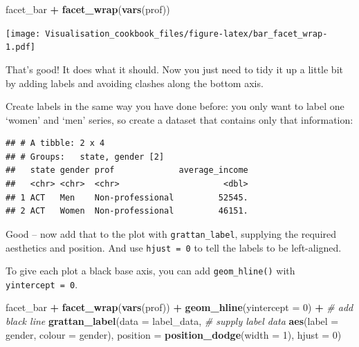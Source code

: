 \documentclass[]{book}
\newenvironment{Shaded}{\begin{snugshade}}{\end{snugshade}}
\newcommand{\CommentTok}[1]{\textcolor[rgb]{0.56,0.35,0.01}{\textit{#1}}}
\newcommand{\DataTypeTok}[1]{\textcolor[rgb]{0.13,0.29,0.53}{#1}}
\newcommand{\DecValTok}[1]{\textcolor[rgb]{0.00,0.00,0.81}{#1}}
\newcommand{\KeywordTok}[1]{\textcolor[rgb]{0.13,0.29,0.53}{\textbf{#1}}}
\newcommand{\NormalTok}[1]{#1}
\newcommand{\OperatorTok}[1]{\textcolor[rgb]{0.81,0.36,0.00}{\textbf{#1}}}
\newcommand{\StringTok}[1]{\textcolor[rgb]{0.31,0.60,0.02}{#1}}
\begin{document}
\begin{Shaded}
\begin{Highlighting}[]
\NormalTok{facet_bar }\OperatorTok{+}
\StringTok{  }\KeywordTok{facet_wrap}\NormalTok{(}\KeywordTok{vars}\NormalTok{(prof))}
\end{Highlighting}
\end{Shaded}

\texttt{[image: Visualisation\_cookbook\_files/figure-latex/bar\_facet\_wrap-1.pdf]}

That's good! It does what it should. Now you just need to tidy it up a little bit by adding labels and avoiding clashes along the bottom axis.

Create labels in the same way you have done before: you only want to label one `women' and `men' series, so create a dataset that contains only that information:

\begin{Shaded}
\end{Shaded}

\begin{verbatim}
## # A tibble: 2 x 4
## # Groups:   state, gender [2]
##   state gender prof             average_income
##   <chr> <chr>  <chr>                     <dbl>
## 1 ACT   Men    Non-professional         52545.
## 2 ACT   Women  Non-professional         46151.
\end{verbatim}

Good -- now add that to the plot with \texttt{grattan\_label}, supplying the required aesthetics and position. And use \texttt{hjust\ =\ 0} to tell the labels to be left-aligned.

To give each plot a black base axis, you can add \texttt{geom\_hline()} with \texttt{yintercept\ =\ 0}.

\begin{Shaded}
\begin{Highlighting}[]
\NormalTok{facet_bar }\OperatorTok{+}
\StringTok{  }\KeywordTok{facet_wrap}\NormalTok{(}\KeywordTok{vars}\NormalTok{(prof)) }\OperatorTok{+}\StringTok{ }
\StringTok{  }\KeywordTok{geom_hline}\NormalTok{(}\DataTypeTok{yintercept =} \DecValTok{0}\NormalTok{) }\OperatorTok{+}\StringTok{  }\CommentTok{# add black line}
\StringTok{  }\KeywordTok{grattan_label}\NormalTok{(}\DataTypeTok{data =}\NormalTok{ label_data, }\CommentTok{# supply label data}
                \KeywordTok{aes}\NormalTok{(}\DataTypeTok{label =}\NormalTok{ gender,}
                    \DataTypeTok{colour =}\NormalTok{ gender),}
                \DataTypeTok{position =} \KeywordTok{position_dodge}\NormalTok{(}\DataTypeTok{width =} \DecValTok{1}\NormalTok{), }
                \DataTypeTok{hjust =} \DecValTok{0}\NormalTok{)}
\end{Highlighting}
\end{Shaded}
\end{document}
